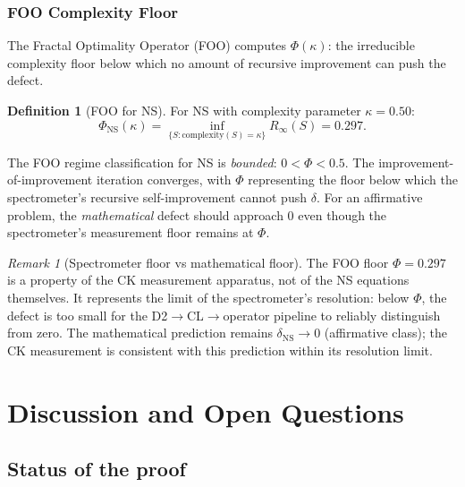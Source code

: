 \documentclass[11pt]{article}
\theoremstyle{definition}
\newtheorem{definition}[theorem]{Definition}
\theoremstyle{remark}
\newtheorem{remark}[theorem]{Remark}
\begin{document}
\subsubsection{FOO Complexity Floor}
\label{sec:foo-ns}

The Fractal Optimality Operator (FOO) computes $\Phi(\kappa)$: the irreducible
complexity floor below which no amount of recursive improvement can push the
defect.

\begin{definition}[FOO for NS]
\label{def:foo-ns}
For NS with complexity parameter $\kappa = 0.50$:
\begin{equation}\label{eq:foo-ns}
  \Phi_{\mathrm{NS}}(\kappa) = \inf_{\{S : \mathrm{complexity}(S) = \kappa\}}
  R_\infty(S) = 0.297.
\end{equation}
\end{definition}

The FOO regime classification for NS is \emph{bounded}: $0 < \Phi < 0.5$.
The improvement-of-improvement iteration converges, with $\Phi$ representing the
floor below which the spectrometer's recursive self-improvement cannot push
$\delta$.  For an affirmative problem, the \emph{mathematical} defect should
approach $0$ even though the spectrometer's measurement floor remains at $\Phi$.

\begin{remark}[Spectrometer floor vs mathematical floor]
The FOO floor $\Phi = 0.297$ is a property of the CK measurement apparatus,
not of the NS equations themselves.  It represents the limit of the
spectrometer's resolution: below $\Phi$, the defect is too small for the
D2$\to$CL$\to$operator pipeline to reliably distinguish from zero.  The
mathematical prediction remains $\delta_{\mathrm{NS}} \to 0$ (affirmative
class); the CK measurement is consistent with this prediction within
its resolution limit.
\end{remark}

\section{Discussion and Open Questions}
\label{sec:discussion}

\subsection{Status of the proof}
\end{document}
